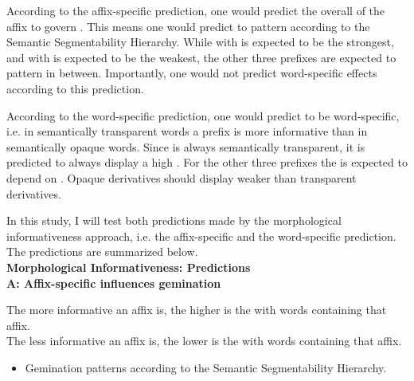 {{According to the affix-specific prediction, one would predict the overall  of the affix to govern . This means one would predict  to pattern according to the Semantic Segmentability Hierarchy. While  with  is expected to be the strongest, and  with  is expected to be the weakest, the other three prefixes are expected to pattern in between. Importantly, one would not predict word-specific effects according to this prediction. 

According to the word-specific prediction, one would predict  to be word-specific, i.e. in semantically transparent words a prefix is more informative than in semantically opaque words. Since  is always semantically transparent, it is predicted to always display a high . For the other three prefixes the  is expected to depend on . Opaque derivatives should display weaker  than transparent derivatives. 

In this study, I will test both predictions made by the morphological informativeness approach, i.e. the affix-specific and the word-specific prediction. The predictions are summarized below.\\


\noindent \textbf{Morphological Informativeness: Predictions}\\	

\noindent 	\textbf{A:\hspace{0.5cm} Affix-specific  influences gemination}
	
\noindent		The more informative an affix is, the higher is the  with words containing that affix. \\
		
\noindent	The less informative an affix is, the lower is the  with words 
		containing that affix. 
	
				\begin{itemize}
	\item	Gemination patterns according to the Semantic Segmentability Hierarchy. 		\\
		

\end{itemize}


}}
